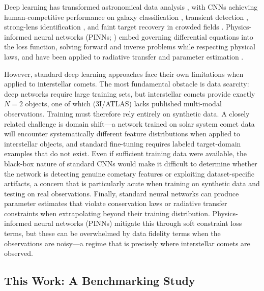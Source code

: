 \documentclass[usenatbib]{mnras}
\begin{document}
Deep learning has transformed astronomical data analysis \citep{baron19}, with CNNs achieving human-competitive performance on galaxy classification \citep{dieleman15}, transient detection \citep{goldstein15}, strong-lens identification \citep{lanusse18}, and faint target recovery in crowded fields \citep{jiang23}. Physics-informed neural networks (PINNs; \citealt{raissi19}) embed governing differential equations into the loss function, solving forward and inverse problems while respecting physical laws, and have been applied to radiative transfer \citep{mishra21,biswal25} and parameter estimation \citep{lu21}.

However, standard deep learning approaches face their own limitations when applied to interstellar comets. The most fundamental obstacle is data scarcity: deep networks require large training sets, but interstellar comets provide exactly $N=2$ objects, one of which (3I/ATLAS) lacks published multi-modal observations. Training must therefore rely entirely on synthetic data. A closely related challenge is domain shift---a network trained on solar system comet data will encounter systematically different feature distributions when applied to interstellar objects, and standard fine-tuning requires labeled target-domain examples that do not exist. Even if sufficient training data were available, the black-box nature of standard CNNs would make it difficult to determine whether the network is detecting genuine cometary features or exploiting dataset-specific artifacts, a concern that is particularly acute when training on synthetic data and testing on real observations. Finally, standard neural networks can produce parameter estimates that violate conservation laws or radiative transfer constraints when extrapolating beyond their training distribution. Physics-informed neural networks (PINNs) mitigate this through soft constraint loss terms, but these can be overwhelmed by data fidelity terms when the observations are noisy---a regime that is precisely where interstellar comets are observed.

\subsection{This Work: A Benchmarking Study}
\end{document}
